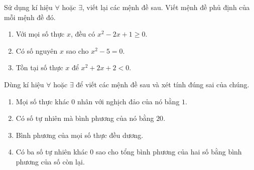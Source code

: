 \begin{bt}%
	Sử dụng kí hiệu $\forall$ hoặc $\exists$, viết lại các mệnh đề sau. Viết mệnh đề phủ định của mỗi mệnh đề đó.
	\begin{enumerate}
		\item Với mọi số thực $x$, đều có $x^2-2x+1 \geq 0$.
		\item  Có số nguyên $x$ sao cho $x^2-5=0$.
		\item  Tồn tại số thực $x$ để $x^2+2x+2<0$.
	\end{enumerate}
\end{bt}

\begin{bt}%
	Dùng kí hiệu $\forall$ hoặc $\exists$ để viết các mệnh đề sau và xét tính đúng sai của chúng.
	\begin{enumerate}
		\item Mọi số thực khác $0$ nhân với nghịch đảo của nó bằng $1$.
		\item  Có số tự nhiên mà bình phương của nó bằng $20$.
		\item  Bình phương của mọi số thực đều dương.
		\item  Có ba số tự nhiên khác $0$ sao cho tổng bình phương của hai số bằng bình phương của số còn lại.
	\end{enumerate}
\end{bt}

